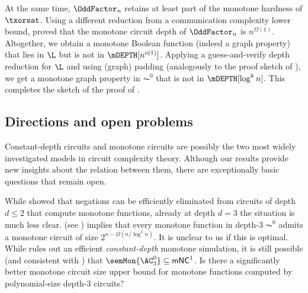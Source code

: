 \documentclass[11pt]{article}
\begin{document}
At the same time, $\OddFactor_n$ retains at least part of the monotone hardness of $\txorsat$. Using a different reduction from a communication complexity lower bound, \cite{DBLP:journals/combinatorica/BabaiGW99} proved that the monotone circuit depth of $\OddFactor_n$ is $n^{\Omega(1)}$. Altogether, we obtain a monotone Boolean function (indeed a graph property) that lies in $\L$ but is not in $\mDEPTH[n^{o(1)}]$. Applying a guess-and-verify depth reduction for $\L$ and using (graph) padding (analogously to the proof sketch of ), we get a monotone graph property in $\AC^0$ that is not in $\mDEPTH[\log^k n]$. This completes the sketch of the proof of .


































\subsection{Directions and open problems}\label{s:questions}

Constant-depth circuits and monotone circuits are possibly the two most widely investigated models in circuit complexity theory. Although our results provide new insights about the relation between them, there are exceptionally basic questions that remain open. 

While \cite{quine_1953} showed that negations can be efficiently eliminated from circuits of depth $d \leq 2$ that compute monotone functions, already at depth $d= 3$ the situation is much less clear.  (see ) implies that every monotone function in depth-$3$ $\AC^0$ admits a monotone circuit of size $2^{n - \Omega(n/\log^2 n)}$. It is unclear to us if this is optimal. While \citep{cos15} rules out an efficient \emph{constant-depth} monotone simulation, it is still possible (and consistent with ) that 
$\semMon{\AC^0_3} \subseteq \mathsf{mNC}^1$. Is there a
significantly better monotone circuit size upper bound for monotone
functions computed by polynomial-size depth-$3$ circuits?
\end{document}
